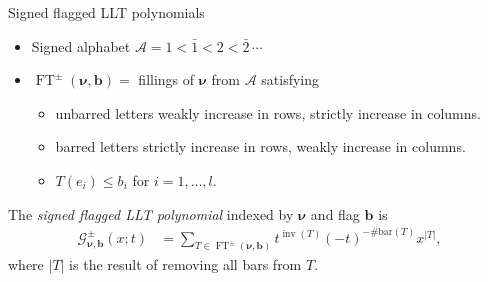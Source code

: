 \documentclass[dvipsnames]{beamer}
\newcommand{\xx}{x}%
\newcommand{\Gcal}{{\mathcal G}}
\newcommand{\nubold}{{\boldsymbol \nu }}
\DeclareMathOperator{\inv}{inv}
\DeclareMathOperator{\FT}{FT}
\newcommand{\Acal}{{\mathcal A}}
\newcommand{\bb}{{\mathbf b}}
\theoremstyle{definition}
\newcounter{c}
\begin{document}
\begin{frame}{Signed flagged LLT polynomials}
 \begin{itemize}
\item Signed alphabet $\Acal = 1 < \bar{1} < 2 < \bar{2} \, \cdots $\pause
\item $\FT^{\pm}(\nubold,\bb) = $ fillings of  $\nubold$ from $\Acal$ satisfying
\begin{itemize}
\item unbarred letters weakly increase in rows, strictly increase in columns.
\item barred letters strictly increase in rows, weakly increase in columns.
\item $T(e_{i}) \le b_i$ for  $i = 1,\dots, l$.\pause
\end{itemize}
\end{itemize}
The \emph{signed flagged LLT polynomial} indexed by \(\nubold\) and
flag \(\bb\) is 
 \begin{align*}
\Gcal^\pm_{\nubold,\bb}(\xx;t) & = \sum_{T \in \FT^{\pm}(\nubold,\bb)} t^{\inv(T)} (-t)^{-\#\text{bar}(T)} \xx^{|T|},
\end{align*}
\vspace{-3.6mm}
where $|T|$ is the result of removing all bars from $T$.
\end{frame}
\end{document}
